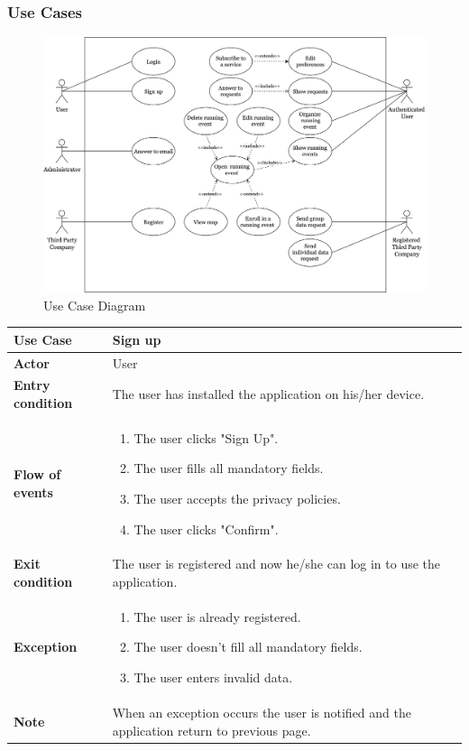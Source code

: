 \documentclass[../main.tex]{subfiles}
\begin{document}
	\subsubsection{Use Cases}
	\begin{figure}[htbp]
		\centering
		\includegraphics[scale=.052]{images/useCaseTrackMe.png}
		\caption{Use Case Diagram \label{fig:Use Case Diagram}}
	\end{figure}
	\begin{center}
		\begin{tabular}{p{3cm}p{8.28cm}}
			\hline
			\textbf{Use Case} & Sign up\\
			\hline
			\textbf{Actor} & User\\
			\hline
			\textbf{Entry condition} & The user has installed the application on his/her device.\\
			\hline
			\textbf{Flow of events} & \begin{enumerate}
				\linespread{0}\item The user clicks "Sign Up".
				\linespread{0}\item The user fills all mandatory fields.
				\linespread{0}\item The user accepts the privacy policies.
				\linespread{0}\item The user clicks "Confirm".
			\end{enumerate}\\
			\hline
			\textbf{Exit condition} & The user is registered and now he/she can log in to use the application.\\
			\hline
			\textbf{Exception} & \begin{enumerate}
				\linespread{0}\item The user is already registered.
				\linespread{0}\item The user doesn't fill all mandatory fields.
				\linespread{0}\item The user enters invalid data.
			\end{enumerate}\\
			\hline
			\textbf{Note} & When an exception occurs the user is notified and the application return to previous page.\\
			\hline
		\end{tabular}
	\end{center}
\end{document}
